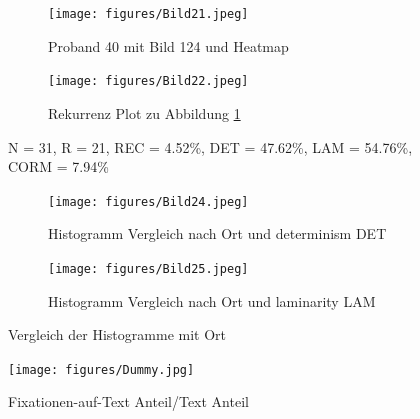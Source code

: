 \documentclass[
    language=german, %
    thesis=seminar, %
    supervisor=postdoc, %
    multiauthor=true, %
    ]{settings/csssa-thesis}
\begin{document}
\begin{figure}[ht]
    \centering
    \begin{subfigure}{0.49\textwidth}
        \centering
        \texttt{[image: figures/Bild21.jpeg]}
        \caption{Proband 40 mit Bild 124 und Heatmap}\label{fig:Bild18a}
    \end{subfigure}
    \begin{subfigure}{0.49\textwidth}
        \centering
        \texttt{[image: figures/Bild22.jpeg]}
        \caption{Rekurrenz Plot zu Abbildung \ref{fig:Bild18a}}\label{fig:Bild18b}
    \end{subfigure}\label{fig:Bild18}
    \caption{N = 31, R = 21, REC = 4.52\%, DET = 47.62\%, LAM = 54.76\%, CORM = 7.94\%}
\end{figure}
\begin{figure}[ht]
    \centering
    \begin{subfigure}{0.49\textwidth}
        \centering
        \texttt{[image: figures/Bild24.jpeg]}
        \caption{Histogramm Vergleich nach Ort und determinism DET }\label{fig:Bild20a}
    \end{subfigure}
    \begin{subfigure}{0.49\textwidth}
        \centering
        \texttt{[image: figures/Bild25.jpeg]}
        \caption{Histogramm Vergleich nach Ort und laminarity LAM}\label{fig:Bild20b}
    \end{subfigure}\label{fig:Bild20}
    \caption{Vergleich der Histogramme mit Ort}
\end{figure}

\begin{figure}[h]
    \centering
    \texttt{[image: figures/Dummy.jpg]}
    \caption{Fixationen-auf-Text Anteil/Text Anteil}\label{fig:bild26}
\end{figure}
\end{document}
